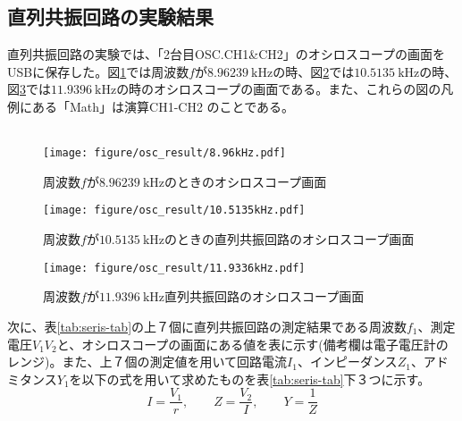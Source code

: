 \documentclass[12pt,a4paper]{jsarticle}
\numberwithin{equation}{section}
\numberwithin{figure}{section}
\numberwithin{table}{section}
\begin{document}
  \subsection{直列共振回路の実験結果}
  直列共振回路の実験では、「2台目OSC.CH1\&CH2」のオシロスコープの画面をUSBに保存した。図\ref{fig:seris-osc1}では周波数$f$が$\SI{8.96239}{\kilo\hertz}$の時、図\ref{fig:seris-osc2}では$\SI{10.5135}{\kilo\hertz}$の時、図\ref{fig:seris-osc3}では$\SI{11.9396}{\kilo\hertz}$の時のオシロスコープの画面である。また、これらの図の凡例にある「Math」は演算CH1-CH2 のことである。
  \\\\
    \begin{figure}[H]
        \centering
          \texttt{[image: figure/osc\_result/8.96kHz.pdf]}
          \caption{周波数$f$が$\SI{8.96239}{\kilo\hertz}$のときのオシロスコープ画面}\label{fig:seris-osc1}
    \end{figure}
    \newpage
    \begin{figure}[H]
        \centering
          \texttt{[image: figure/osc\_result/10.5135kHz.pdf]}
          \caption{周波数$f$が$\SI{10.5135}{\kilo\hertz}$のときの直列共振回路のオシロスコープ画面}\label{fig:seris-osc2}
    \end{figure}
    \begin{figure}[H]
      \centering
        \texttt{[image: figure/osc\_result/11.9336kHz.pdf]}
        \caption{周波数$f$が$\SI{11.9396}{\kilo\hertz}$直列共振回路のオシロスコープ画面}\label{fig:seris-osc3}
    \end{figure}

    \newpage
    次に、表\ref{tab:seris-tab}の上７個に直列共振回路の測定結果である周波数$f_1$、測定電圧$V_1V_2$と、オシロスコープの画面にある値を表に示す(備考欄は電子電圧計のレンジ)。また、上７個の測定値を用いて回路電流$I_1$、インピーダンス$Z_1$、アドミタンス$Y_1$を以下の式を用いて求めたものを表\ref{tab:seris-tab}下３つに示す。
    \begin{equation}
      I=\dfrac{V_1}{r}, \quad\quad Z=\dfrac{V_2}{I}, \quad\quad Y=\dfrac{1}{Z}
    \end{equation}
\end{document}
